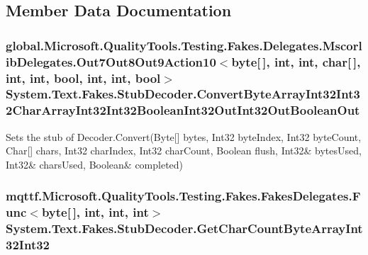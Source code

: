 \subsection{Member Data Documentation}
\hypertarget{class_system_1_1_text_1_1_fakes_1_1_stub_decoder_afe5570f8b54582c99417473d74d4dbb4}{
\subsubsection[{Convert\-Byte\-Array\-Int32\-Int32\-Char\-Array\-Int32\-Int32\-Boolean\-Int32\-Out\-Int32\-Out\-Boolean\-Out}]{\setlength{\rightskip}{0pt plus 5cm}global.\-Microsoft.\-Quality\-Tools.\-Testing.\-Fakes.\-Delegates.\-Mscorlib\-Delegates.\-Out7\-Out8\-Out9\-Action10$<$byte\mbox{[}$\,$\mbox{]}, int, int, char\mbox{[}$\,$\mbox{]}, int, int, bool, int, int, bool$>$ System.\-Text.\-Fakes.\-Stub\-Decoder.\-Convert\-Byte\-Array\-Int32\-Int32\-Char\-Array\-Int32\-Int32\-Boolean\-Int32\-Out\-Int32\-Out\-Boolean\-Out}}\label{class_system_1_1_text_1_1_fakes_1_1_stub_decoder_afe5570f8b54582c99417473d74d4dbb4}


Sets the stub of Decoder.\-Convert(Byte\mbox{[}\mbox{]} bytes, Int32 byte\-Index, Int32 byte\-Count, Char\mbox{[}\mbox{]} chars, Int32 char\-Index, Int32 char\-Count, Boolean flush, Int32\& bytes\-Used, Int32\& chars\-Used, Boolean\& completed)

\hypertarget{class_system_1_1_text_1_1_fakes_1_1_stub_decoder_a75dba7227183044a41196cfa75f34a6f}{
\subsubsection[{Get\-Char\-Count\-Byte\-Array\-Int32\-Int32}]{\setlength{\rightskip}{0pt plus 5cm}mqttf.\-Microsoft.\-Quality\-Tools.\-Testing.\-Fakes.\-Fakes\-Delegates.\-Func$<$byte\mbox{[}$\,$\mbox{]}, int, int, int$>$ System.\-Text.\-Fakes.\-Stub\-Decoder.\-Get\-Char\-Count\-Byte\-Array\-Int32\-Int32}}\label{class_system_1_1_text_1_1_fakes_1_1_stub_decoder_a75dba7227183044a41196cfa75f34a6f}


